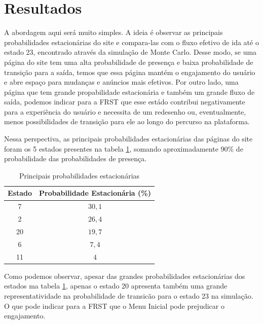 \section{Resultados}
A abordagem aqui será muito simples. A ideia é observar as principais probabilidades estacionárias do site e compara-las com o fluxo efetivo de ida até o estado 23, encontrado através da simulação de Monte Carlo. Desse modo, se uma página do site tem uma alta probabilidade de presença e baixa probabilidade de transição para a saída, temos que essa página mantém o engajamento do usuário e abre espaço para mudanças e anúncios mais efetivos. Por outro lado, uma página que tem grande propabilidade estacionária e também um grande fluxo de saída, podemos indicar para a FRST que esse estádo contribui negativamente para a experiência do usuário e necessita de um redesenho ou, eventualmente, menos possibilidades de transição para ele ao longo do percurso na plataforma.

Nessa perspectiva, as principais probabilidades estacionárias das páginas do site foram os 5 estados presentes na tabela \ref{tab:stationary_probabilities}, somando aproximadamente 90\% de probabilidade das probabilidades de presença.

\begin{table}[ht]
\centering
\begin{tabular}{cc}
\hline
Estado & Probabilidade Estacionária (\%)\\ \hline
7 & \(30,1\) \\
2 & \(26,4\) \\
20 & \(19,7\) \\
6 & \(7,4\) \\
11 & \(4\) \\ \hline
\end{tabular}
\caption{Principais probabilidades estacionárias}
\label{tab:stationary_probabilities}
\end{table}

Como podemos observar, apesar das grandes probabilidades estacionárias dos estados ma tabela \ref{tab:stationary_probabilities}, apenas o estado 20 apresenta também uma grande representatividade na probabilidade de transicão para o estado 23 na simulação. O que pode indicar para a FRST que o Menu Inicial pode prejudicar o engajamento. 

